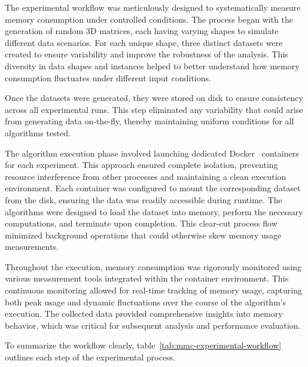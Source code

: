 The experimental workflow was meticulously designed to systematically measure memory consumption under controlled conditions.
The process began with the generation of random 3D matrices, each having varying shapes to simulate different data scenarios.
For each unique shape, three distinct datasets were created to ensure variability and improve the robustness of the analysis.
This diversity in data shapes and instances helped to better understand how memory consumption fluctuates under different input conditions.

Once the datasets were generated, they were stored on disk to ensure consistency across all experimental runs.
This step eliminated any variability that could arise from generating data on-the-fly, thereby maintaining uniform conditions for all algorithms tested.

The algorithm execution phase involved launching dedicated Docker~\cite{docker} containers for each experiment.
This approach ensured complete isolation, preventing resource interference from other processes and maintaining a clean execution environment.
Each container was configured to mount the corresponding dataset from the disk, ensuring the data was readily accessible during runtime.
The algorithms were designed to load the dataset into memory, perform the necessary computations, and terminate upon completion.
This clear-cut process flow minimized background operations that could otherwise skew memory usage measurements.

Throughout the execution, memory consumption was rigorously monitored using various measurement tools integrated within the container environment.
This continuous monitoring allowed for real-time tracking of memory usage, capturing both peak usage and dynamic fluctuations over the course of the algorithm's execution.
The collected data provided comprehensive insights into memory behavior, which was critical for subsequent analysis and performance evaluation.

To summarize the workflow clearly, table~\ref{tab:mmc-experimental-workflow} outlines each step of the experimental process.

